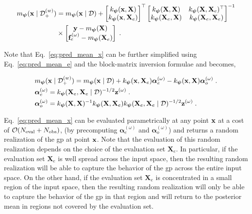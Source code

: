 \begin{equation}
\begin{split}
    m_{\boldsymbol{\psi}}(\mathbf{x} \mid \mathcal{D}_{+}^{(w)}) & = m_{\boldsymbol{\psi}}(\mathbf{x} \mid \mathcal{D}) + \begin{bmatrix} k_{\boldsymbol{\psi}}(\mathbf{x}, \mathbf{X}) \\ k_{\boldsymbol{\psi}}(\mathbf{x}, \mathbf{X}_e) \end{bmatrix}^{\top} \begin{bmatrix} k_{\boldsymbol{\psi}}(\mathbf{X}, \mathbf{X}) & k_{\boldsymbol{\psi}}(\mathbf{X}, \mathbf{X}_e)^{\top} \\ k_{\boldsymbol{\psi}}(\mathbf{X}_e, \mathbf{X}) & k_{\boldsymbol{\psi}}(\mathbf{X}_e, \mathbf{X}_e) \end{bmatrix}^{-1} \\
    & \times \begin{bmatrix} \mathbf{y} - m_{\boldsymbol{\psi}}(\mathbf{X}) \\ \mathbf{f}_e^{(\omega)} - m_{\boldsymbol{\psi}}(\mathbf{X}_e) \end{bmatrix}\;.
\end{split}
\label{eq:pred_mean_x}
\end{equation}

Note that Eq.~\eqref{eq:pred_mean_x} can be further simplified using Eq.~\eqref{eq:pred_mean_e} and the block-matrix inversion formulae and becomes,

\begin{equation}
    \left.
    \begin{aligned}
      &m_{\boldsymbol{\psi}}(\mathbf{x} \mid \mathcal{D}_{+}^{(w)}) = m_{\boldsymbol{\psi}}(\mathbf{x} \mid \mathcal{D}) + k_{\boldsymbol{\psi}}(\mathbf{x}, \mathbf{X}_e) \boldsymbol{\alpha}_e^{(\omega)} - k_{\boldsymbol{\psi}}(\mathbf{x}, \mathbf{X}) \boldsymbol{\alpha}_o^{(\omega)}\;.\\
      &\boldsymbol{\alpha}_e^{(\omega)} = k_{\boldsymbol{\psi}}(\mathbf{X}_e, \mathbf{X}_e \mid \mathcal{D})^{-1/2} \mathbf{z}^{(\omega)}\;.\\
      &\boldsymbol{\alpha}_o^{(\omega)} =  k_{\boldsymbol{\psi}}(\mathbf{X}, \mathbf{X})^{-1}k_{\boldsymbol{\psi}}(\mathbf{X}, \mathbf{X}_e) k_{\boldsymbol{\psi}}(\mathbf{X}_e, \mathbf{X}_e \mid \mathcal{D})^{-1/2} \mathbf{z}^{(\omega)}\;.
    \end{aligned}
    \right.
\label{eq:pred_mean_x_simp}
\end{equation}

Eq.~\eqref{eq:pred_mean_x} can be evaluated parametrically at any point $\mathbf{x}$ at a cost of $\mathcal{O}(N_{\mathrm{eval}}+ N_{\mathrm{obs}})$, (by precomputing $\boldsymbol{\alpha}_e^{(\omega)}$ and $\boldsymbol{\alpha}_o^{(\omega)}$) and returns a random realization of the \gls{gp} at point $\mathbf{x}$. Note that the evaluation of this random realization depends on the choice of the evaluation set $\mathbf{X}_e$. In particular, if the evaluation set $\mathbf{X}_e$ is well spread across the input space, then the resulting random realization will be able to capture the behavior of the \gls{gp} across the entire input space. On the other hand, if the evaluation set $\mathbf{X}_e$ is concentrated in a small region of the input space, then the resulting random realization will only be able to capture the behavior of the \gls{gp} in that region and will return to the posterior mean in regions not covered by the evaluation set.


